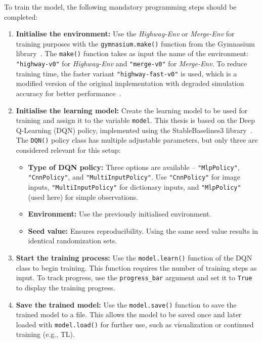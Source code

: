 To train the model, the following mandatory programming steps should be completed:

\begin{enumerate}
    \item \textbf{Initialise the environment:} Use the \emph{Highway-Env} or \emph{Merge-Env} for training purposes with the \texttt{gymnasium.make()} function from the Gymnasium library~\cite{towers2024gymnasiumstandardinterfacereinforcement}. 
    The \texttt{make()} function takes as input the name of the environment: \texttt{"highway-v0"} for \emph{Highway-Env} and \texttt{"merge-v0"} for \emph{Merge-Env}. 
    To reduce training time, the faster variant \texttt{"highway-fast-v0"} is used, which is a modified version of the original implementation with degraded simulation accuracy for better performance~\cite{highway-env}.

    \item \textbf{Initialise the learning model:} Create the learning model to be used for training and assign it to the variable \texttt{model}. 
    This thesis is based on the Deep Q-Learning (DQN) policy, implemented using the StableBaselines3 library~\cite{stable-baselines3}. 
    The \texttt{DQN()} policy class has multiple adjustable parameters, but only three are considered relevant for this setup:
    \begin{itemize}
        \item \textbf{Type of DQN policy:} Three options are available -- \texttt{"MlpPolicy"}, \texttt{"CnnPolicy"}, and \texttt{"MultiInputPolicy"}. 
        Use \texttt{"CnnPolicy"} for image inputs, \texttt{"MultiInputPolicy"} for dictionary inputs, and \texttt{"MlpPolicy"} (used here) for simple observations.
        \item \textbf{Environment:} Use the previously initialised environment.
        \item \textbf{Seed value:} Ensures reproducibility. Using the same seed value results in identical randomization sets.
    \end{itemize}

    \item \textbf{Start the training process:} Use the \texttt{model.learn()} function of the DQN class to begin training. 
    This function requires the number of training steps as input. 
    To track progress, use the \texttt{progress\_bar} argument and set it to \texttt{True} to display the training progress.

    \item \textbf{Save the trained model:} Use the \texttt{model.save()} function to save the trained model to a file. 
    This allows the model to be saved once and later loaded with \texttt{model.load()} for further use, such as visualization or continued training (e.g., TL).
\end{enumerate}


